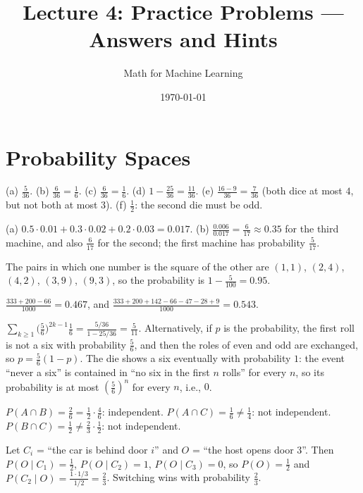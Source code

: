 \documentclass[11pt]{article}
\title{Lecture 4: Practice Problems --- Answers and Hints}
\author{Math for Machine Learning}
\date{\today}
\begin{document}
\maketitle

\section*{Probability Spaces}

\begin{description}[leftmargin=0pt, itemsep=0.3em]
    \item[\ref{pr:dice}.] (a) $\frac{5}{36}$. (b) $\frac{6}{36} = \frac{1}{6}$. (c) $\frac{6}{36} = \frac{1}{6}$. (d) $1 - \frac{25}{36} = \frac{11}{36}$. (e) $\frac{16 - 9}{36} = \frac{7}{36}$ (both dice at most $4$, but not both at most $3$). (f) $\frac{1}{2}$: the second die must be odd.
    \item[\ref{pr:machines}.] (a) $0.5 \cdot 0.01 + 0.3 \cdot 0.02 + 0.2 \cdot 0.03 = 0.017$. (b) $\frac{0.006}{0.017} = \frac{6}{17} \approx 0.35$ for the third machine, and also $\frac{6}{17}$ for the second; the first machine has probability $\frac{5}{17}$.
    \item[\ref{pr:squares}.] The pairs in which one number is the square of the other are $(1, 1)$, $(2, 4)$, $(4, 2)$, $(3, 9)$, $(9, 3)$, so the probability is $1 - \frac{5}{100} = 0.95$.
    \item[\ref{pr:divisible}.] $\frac{333 + 200 - 66}{1000} = 0.467$, and $\frac{333 + 200 + 142 - 66 - 47 - 28 + 9}{1000} = 0.543$.
    \item[\ref{pr:first-six}.] $\sum_{k \geq 1} \big(\frac{5}{6}\big)^{2k-1}\frac{1}{6} = \frac{5/36}{1 - 25/36} = \frac{5}{11}$. Alternatively, if $p$ is the probability, the first roll is not a six with probability $\frac{5}{6}$, and then the roles of even and odd are exchanged, so $p = \frac{5}{6}(1 - p)$. The die shows a six eventually with probability $1$: the event ``never a six'' is contained in ``no six in the first $n$ rolls'' for every $n$, so its probability is at most $(\frac{5}{6})^n$ for every $n$, i.e., $0$.
    \item[\ref{pr:independent-events}.] $P(A \cap B) = \frac{2}{6} = \frac{1}{2} \cdot \frac{4}{6}$: independent. $P(A \cap C) = \frac{1}{6} \neq \frac{1}{4}$: not independent. $P(B \cap C) = \frac{1}{2} \neq \frac{2}{3} \cdot \frac{1}{2}$: not independent.
    \item[\ref{pr:monty-hall}.] Let $C_i$ = ``the car is behind door $i$'' and $O$ = ``the host opens door $3$''. Then $P(O \mid C_1) = \frac{1}{2}$, $P(O \mid C_2) = 1$, $P(O \mid C_3) = 0$, so $P(O) = \frac{1}{2}$ and $P(C_2 \mid O) = \frac{1 \cdot 1/3}{1/2} = \frac{2}{3}$. Switching wins with probability $\frac{2}{3}$.
\end{description}
\end{document}
